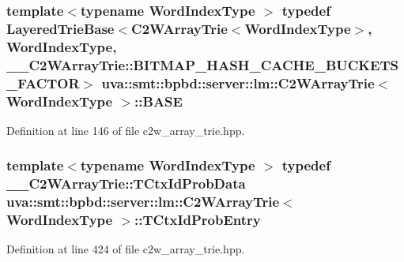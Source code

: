 \subsubsection[{B\+A\+S\+E}]{\setlength{\rightskip}{0pt plus 5cm}template$<$typename Word\+Index\+Type $>$ typedef {\bf Layered\+Trie\+Base}$<${\bf C2\+W\+Array\+Trie}$<${\bf Word\+Index\+Type}$>$, {\bf Word\+Index\+Type}, \+\_\+\+\_\+\+C2\+W\+Array\+Trie\+::\+B\+I\+T\+M\+A\+P\+\_\+\+H\+A\+S\+H\+\_\+\+C\+A\+C\+H\+E\+\_\+\+B\+U\+C\+K\+E\+T\+S\+\_\+\+F\+A\+C\+T\+O\+R$>$ {\bf uva\+::smt\+::bpbd\+::server\+::lm\+::\+C2\+W\+Array\+Trie}$<$ {\bf Word\+Index\+Type} $>$\+::{\bf B\+A\+S\+E}}\label{classuva_1_1smt_1_1bpbd_1_1server_1_1lm_1_1_c2_w_array_trie_a41928028d8a20a85548496b5e0ce3759}


Definition at line 146 of file c2w\+\_\+array\+\_\+trie.\+hpp.

\hypertarget{classuva_1_1smt_1_1bpbd_1_1server_1_1lm_1_1_c2_w_array_trie_ac4e86de24f58ddce661d2b5d418b4ff2}{}
\subsubsection[{T\+Ctx\+Id\+Prob\+Entry}]{\setlength{\rightskip}{0pt plus 5cm}template$<$typename Word\+Index\+Type $>$ typedef {\bf \+\_\+\+\_\+\+C2\+W\+Array\+Trie\+::\+T\+Ctx\+Id\+Prob\+Data} {\bf uva\+::smt\+::bpbd\+::server\+::lm\+::\+C2\+W\+Array\+Trie}$<$ {\bf Word\+Index\+Type} $>$\+::{\bf T\+Ctx\+Id\+Prob\+Entry}\hspace{0.3cm}{\ttfamily [protected]}}\label{classuva_1_1smt_1_1bpbd_1_1server_1_1lm_1_1_c2_w_array_trie_ac4e86de24f58ddce661d2b5d418b4ff2}


Definition at line 424 of file c2w\+\_\+array\+\_\+trie.\+hpp.

\hypertarget{classuva_1_1smt_1_1bpbd_1_1server_1_1lm_1_1_c2_w_array_trie_af281f0e5bbebee6a83ad2d967656d35b}{}
